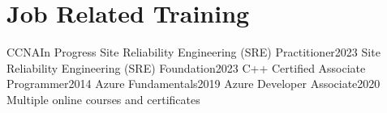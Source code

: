 \section{Job Related Training}
    \resumeSubHeadingListStart
      
      \resumeProjectHeading
          {{CCNA}}{In Progress}
      \resumeProjectHeading
          {{Site Reliability Engineering (SRE) Practitioner}}{2023}
      \resumeProjectHeading
          {{Site Reliability Engineering (SRE) Foundation}}{2023}
      \resumeProjectHeading
          {{C++ Certified Associate Programmer}}{2014}
      \resumeProjectHeading
          {{Azure Fundamentals}}{2019}
      \resumeProjectHeading
          {{Azure Developer Associate}}{2020}
      \resumeProjectHeading
          {{Multiple online courses and certificates}}{}
          
    \resumeSubHeadingListEnd